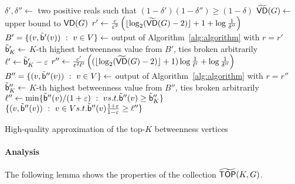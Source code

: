 \begin{algorithm}[ht]
   \DontPrintSemicolon
  $\delta',\delta''\leftarrow$ two positive reals such that
  $(1-\delta')(1-\delta'')\ge(1-\delta)$\;
  $\widetilde{\mathsf{VD}}(G)\leftarrow$ upper bound to $\mathsf{VD}(G)$\;
  $r'\leftarrow\frac{c}{\varepsilon^2}\left(\lfloor\log_2(\widetilde{\mathsf{VD}}(G)-2)\rfloor+1+\log\frac{1}{\delta''}\right)$\;
  $B'=\{(v,\tilde{\mathsf{b}}'(v)) ~:~ v\in V\}\leftarrow$ output of Algorithm~\ref{alg:algorithm} with $r=r'$\;
  $\tilde{\mathsf{b}}_K'\leftarrow$ $K$-th highest betweenness value from $B'$, ties
  broken arbitrarily\;
  $\ell'\leftarrow\tilde{\mathsf{b}}_K'-\varepsilon$\;
  $r''\leftarrow\frac{c'}{\varepsilon^2\ell'}\left((\lfloor\log_2(\widetilde{\mathsf{VD}}(G)-2)\rfloor+1)\log\frac{1}{\ell'}+\log\frac{1}{\delta''}\right)$\;
  $B''=\{(v,\tilde{\mathsf{b}}''(v)) ~:~ v\in V\}\leftarrow$ output of
  Algorithm~\ref{alg:algorithm} with $r=r''$\;
  $\tilde{\mathsf{b}}_K''\leftarrow$ $K$-th highest betweenness value from $B''$, ties
  broken arbitrarily\;
  $\ell''\leftarrow\min\{\tilde{\mathsf{b}}''(v)/(1+\varepsilon) ~:~ v \relax{ s.t. }
  \tilde{\mathsf{b}}''(v)\ge\tilde{\mathsf{b}}_K''\}$\;
  \Return $\{(v,\tilde{\mathsf{b}}''(v)) ~:~ v\in V \relax{ s.t. }
  \tilde{\mathsf{b}}''(v)\frac{1+\varepsilon}{1-\varepsilon}\ge\ell''\}$\;
  \caption{High-quality approximation of the top-$K$ betweenness vertices}
  \label{alg:topk}
\end{algorithm}

\paragraph{Analysis}
The following lemma shows the properties of the collection $\widetilde{\mathsf{TOP}}(K,G)$.
\fi

